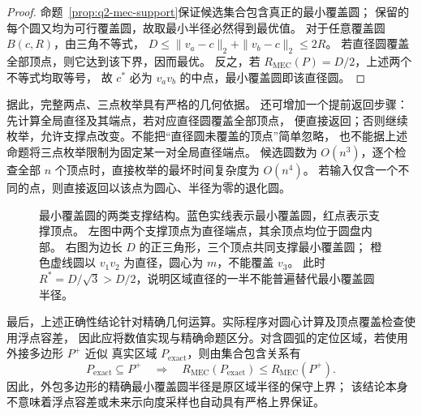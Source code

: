 \begin{proof}
命题~\ref{prop:q2-mec-support}保证候选集合包含真正的最小覆盖圆；
保留的每个圆又均为可行覆盖圆，故取最小半径必然得到最优值。
对于任意覆盖圆 $B(c,R)$，由三角不等式，
$D\le\|v_a-c\|_2+\|v_b-c\|_2\le2R$。
若直径圆覆盖全部顶点，则它达到该下界，因而最优。
反之，若 $R_{\mathrm{MEC}}(P)=D/2$，上述两个不等式均取等号，
故 $c^*$ 必为 $v_av_b$ 的中点，最小覆盖圆即该直径圆。
\end{proof}

据此，完整两点、三点枚举具有严格的几何依据。
还可增加一个提前返回步骤：先计算全局直径及其端点，若对应直径圆覆盖全部顶点，
便直接返回；否则继续枚举，允许支撑点改变。不能把“直径圆未覆盖的顶点”简单忽略，
也不能据上述命题将三点枚举限制为固定某一对全局直径端点。
候选圆数为 $O(n^3)$，逐个检查全部 $n$ 个顶点时，直接枚举的最坏时间复杂度为 $O(n^4)$。
若输入仅含一个不同的点，则直接返回以该点为圆心、半径为零的退化圆。

\begin{figure}[htbp]
 \centering
 \resizebox{.96\linewidth}{!}{}
 \caption{最小覆盖圆的两类支撑结构。蓝色实线表示最小覆盖圆，红点表示支撑顶点。
 左图中两个支撑顶点为直径端点，其余顶点均位于圆盘内部。
 右图为边长 $D$ 的正三角形，三个顶点共同支撑最小覆盖圆；
 橙色虚线圆以 $v_1v_2$ 为直径，圆心为 $m$，不能覆盖 $v_3$。
 此时 $R^*=D/\sqrt3>D/2$，说明区域直径的一半不能普遍替代最小覆盖圆半径。}
 \label{fig:q2-mec-support}
\end{figure}

最后，上述正确性结论针对精确几何运算。实际程序对圆心计算及顶点覆盖检查使用浮点容差，
因此应将数值实现与精确命题区分。对含圆弧的定位区域，若使用外接多边形 $P^+$ 近似
真实区域 $P_{\mathrm{exact}}$，则由集合包含关系有
\[
 P_{\mathrm{exact}}\subseteq P^+
 \quad\Longrightarrow\quad
 R_{\mathrm{MEC}}(P_{\mathrm{exact}})\le R_{\mathrm{MEC}}(P^+).
\]
因此，外包多边形的精确最小覆盖圆半径是原区域半径的保守上界；
该结论本身不意味着浮点容差或未来示向度采样也自动具有严格上界保证。
